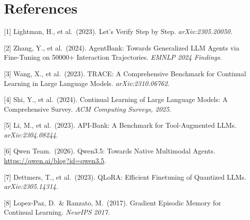 \documentclass{article}
\begin{document}
\section*{References}
\small

[1] Lightman, H., et al.\ (2023). Let's Verify Step by Step. \textit{arXiv:2305.20050}.

[2] Zhang, Y., et al.\ (2024). AgentBank: Towards Generalized LLM Agents via Fine-Tuning on 50000+ Interaction Trajectories. \textit{EMNLP 2024 Findings}.

[3] Wang, X., et al.\ (2023). TRACE: A Comprehensive Benchmark for Continual Learning in Large Language Models. \textit{arXiv:2310.06762}.

[4] Shi, Y., et al.\ (2024). Continual Learning of Large Language Models: A Comprehensive Survey. \textit{ACM Computing Surveys, 2025}.

[5] Li, M., et al.\ (2023). API-Bank: A Benchmark for Tool-Augmented LLMs. \textit{arXiv:2304.08244}.

[6] Qwen Team.\ (2026). Qwen3.5: Towards Native Multimodal Agents. \url{https://qwen.ai/blog?id=qwen3.5}.

[7] Dettmers, T., et al.\ (2023). QLoRA: Efficient Finetuning of Quantized LLMs. \textit{arXiv:2305.14314}.

[8] Lopez-Paz, D.\ \& Ranzato, M.\ (2017). Gradient Episodic Memory for Continual Learning. \textit{NeurIPS 2017}.
\end{document}
